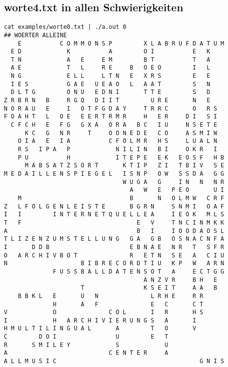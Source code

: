 \documentclass[a4paper,10pt,ngerman]{scrartcl}
\begin{document}
\subsection*{worte4.txt in allen Schwierigkeiten}
\begin{lstlisting}
cat examples/worte0.txt | ./a.out 0
## WOERTER ALLEINE
    E           C O M M O N S P         X L A B R U F D A T U M
  E D             K           A         O I           E   K    
  T N             A   E     E M         B T           T   A    
  A E             T   L     R E     B   O E O         I   L    
  N G             E L L     L T N   E   X R S         E   E    
  I E S           G A E   U E A O   L   A A T         S   N    
  D L T G         O N U   E D N I       T T E         S   D    
Z R B R N   B     R G Q   D I I T         U R E       N   E    
N O R A U   E     I   O T F G D A Y     T R R C       O   R S  
F O A H T   L   O E   E E R T R M R     H   E R     D I   S I  
  C F C H   E   F G   G X A   O R A   B C   I U     N S E T E  
      K C   G   N R     T     O O N E D E   C O     A S M I W  
    O I A   E   I A           C F O L M R   H S     L U A L N  
    R S   I P A   P             N I L I N   B I     O K R   I  
    P U           H             I T E P E   E K   E O S F   H B
      M A B S A T Z S O R T       K T I P   Z I   T B I V   S E
M E D A I L L E N S P I E G E L   I S N P   O W   S S D A   G G
                                  W U G A   G     I N   N   N R
                                    A   W   E   P E O       U I
    M                               B       N   O L M W   C R F
Z   L F O L G E N L E I S T E       B G R N     S N M I   O A F
I   I         I N T E R N E T Q U E L L E A     I E O K   M L S
T   F                                 E   V     T N C I N M K K
A                                     B   I     I O O D A O S L
T L I Z E N Z U M S T E L L U N G   G A   G B   O S N A C N F A
I       D D B                       E B N A E   N R   T   S F R
O   A R C H I V B O T               R   E T N   S E   A   C I U
N                     B I B R E C O R D T I U   K P   W   A R N
              F U S S B A L L D A T E N S O T   A     E C T G G
                                        A N Z V R     B H   E  
                      T                 K S E I T     A A   B  
    B B K L   E       U   N               L R H E     R R      
              H       A   F               E   C       C T      
V             O               C O L       I   R       H S      
I             H   A R C H I V I E R U N G S   A       I        
H M U L T I L I N G U A L       A         T   O       V        
C         D O I                 U         E   T                
R       S M I L E Y             S             U                
A                             C E N T E R     A                
A L L M U S I C                                         G N I S


\end{lstlisting}
\end{document}
